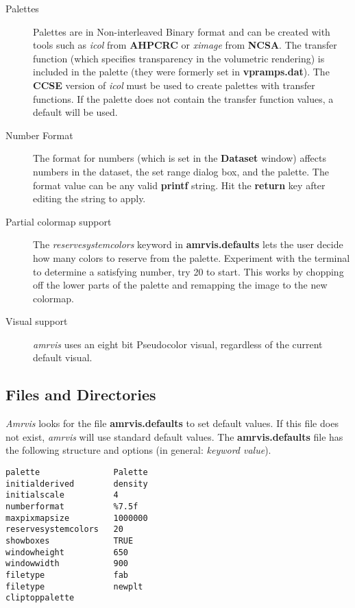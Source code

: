 \begin{description}
\item [Palettes]
Palettes are in Non-interleaved Binary format and can be created
with tools such as {\em icol} from {\bf AHPCRC} or {\em ximage}
from {\bf NCSA}.  The transfer function (which specifies transparency
in the volumetric rendering) is included in the palette (they were
formerly set in {\bf vpramps.dat}).
The {\bf CCSE} version of {\em icol} must be used to create palettes
with transfer functions.
If the palette does not contain the transfer function values,
a default will be used.


\item [Number Format] The format for numbers (which is set in the
{\bf Dataset} window) affects numbers in the dataset, the set range
dialog box, and the palette.  The format value can be any valid {\bf printf}
string.  Hit the {\bf return} key after editing the string to apply.

\item [Partial colormap support]   The {\em reservesystemcolors} keyword
in {\bf amrvis.defaults} lets the user decide how many colors
to reserve from the palette.   Experiment with the terminal
to determine a satisfying number, try 20 to start.  This works
by chopping off the lower parts of the palette and remapping the
image to the new colormap.

\item [Visual support]
{\em amrvis} uses an eight bit Pseudocolor visual, regardless of the
current default visual.

\end{description}



\subsection{Files and Directories}

{\em Amrvis} looks for the file {\bf amrvis.defaults} to set default values.
If this file does not exist, {\em amrvis} will use standard default values.
The {\bf amrvis.defaults} file has the following structure and options
(in general: {\em keyword   value}).


\begin{verbatim}
palette               Palette
initialderived        density
initialscale          4
numberformat          %7.5f
maxpixmapsize         1000000
reservesystemcolors   20
showboxes             TRUE
windowheight          650
windowwidth           900
filetype              fab
filetype              newplt
cliptoppalette
\end{verbatim}


